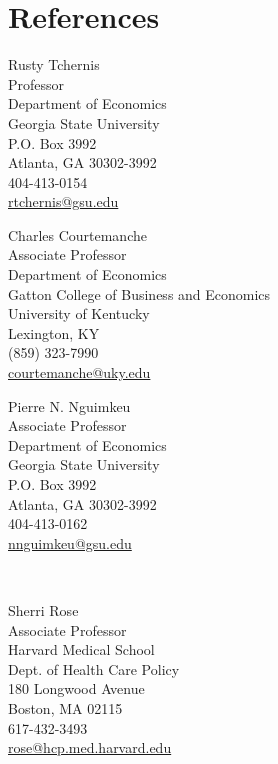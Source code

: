 \documentclass[12pt,letterpaper]{article}
\begin{document}
\section*{References}
\begin{minipage}{0.3\textwidth}
	Rusty Tchernis\\
	Professor\\
	Department of Economics\\
	Georgia State University\\
	P.O. Box 3992\\
	Atlanta, GA 30302-3992\\
	404-413-0154\\
	\href{mailto:rtchernis@gsu.edu}{rtchernis@gsu.edu}
\end{minipage}
\begin{minipage}{0.4\textwidth}
Charles Courtemanche\\
Associate Professor\\
Department of Economics\\
Gatton College of Business and Economics\\
University of Kentucky\\ 
Lexington, KY\\
(859) 323-7990\\
\href{mailto:courtemanche@uky.edu}{courtemanche@uky.edu}
\end{minipage}
\begin{minipage}{0.3\textwidth}
	Pierre N. Nguimkeu\\
	Associate Professor \\
	Department of Economics\\
	Georgia State University\\
	P.O. Box 3992\\
	Atlanta, GA 30302-3992\\
	404-413-0162\\
	\href{mailto:nnguimkeu@gsu.edu}{nnguimkeu@gsu.edu}
\end{minipage}\\

\vspace{10 mm}

\begin{minipage}{0.3\textwidth}
	Sherri Rose \\
	Associate Professor\\
	Harvard Medical School\\
	Dept. of Health Care Policy\\
	180 Longwood Avenue \\
    Boston, MA 02115 \\ 
	617-432-3493\\
	\href{mailto:rose@hcp.med.harvard.edu}{rose@hcp.med.harvard.edu}
\end{minipage}
\fi 
\end{document}
